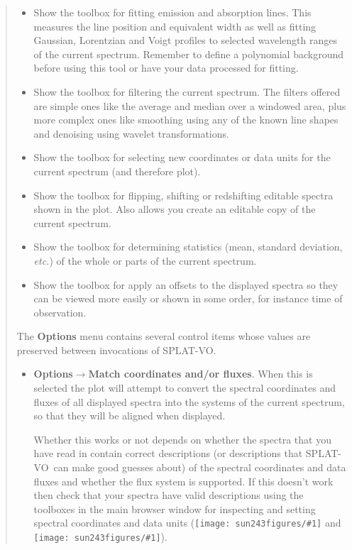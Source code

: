 \documentclass[twoside,11pt]{article}
\newcommand{\htmladdimg}[1]{}
\newcommand{\latexhtml}[2]{#1}
\renewcommand{\_}{\texttt{\symbol{95}}}
\newcommand{\SPLAT}{\textsf{SPLAT-VO}}
\newcommand{\inline}[1]
        {\latexhtml{\texttt{[image: sun243\_figures/\#1]}}
        {\htmladdimg[align=center]{#1.gif}}}
\newcommand{\menuitem}[1]{\textbf{#1}}
\newcommand{\submenuitem}[2]{\latexhtml{\textbf{#1$\rightarrow$#2}}{\textbf{#1->#2}}}
\newcommand{\etc}{\textit{etc.}}
\begin{document}
\begin{quote}
\begin{itemize}
  \item[\inline{fitline}] Show the toolbox for fitting emission and absorption
  lines. This measures the line position and equivalent width as well as
  fitting Gaussian, Lorentzian and Voigt profiles to selected wavelength
  ranges of the current spectrum. Remember to define a polynomial background
  before using this tool or have your data processed for fitting.

  \item[\inline{filter}] Show the toolbox for filtering the current
  spectrum. The filters offered are simple ones like the average and
  median over a windowed area, plus more complex ones like smoothing
  using any of the known line shapes and denoising using wavelet
  transformations.

  \item[\inline{units}] Show the toolbox for selecting new coordinates or
  data units for the current spectrum (and therefore plot).

  \item[\inline{flip}] Show the toolbox for flipping, shifting or redshifting
  editable spectra shown in the plot. Also allows you create an editable copy
  of the current spectrum.

  \item[\inline{sigma}] Show the toolbox for determining statistics (mean,
  standard deviation, \etc) of the whole or parts of the current spectrum.

  \item[\inline{stacker}] Show the toolbox for apply an offsets to the
  displayed spectra so they can be viewed more easily or shown in some order,
  for instance time of observation.

 \end{itemize}

 The \menuitem{Options} menu contains several control items whose values are
 preserved between invocations of \SPLAT.

 \begin{itemize}

  \item \submenuitem{Options}{Match coordinates and/or fluxes}.
  When this is selected the plot will attempt to convert the spectral
  coordinates and fluxes of all displayed spectra into the systems of the
  current spectrum, so that they will be aligned when displayed.

  Whether this works or not depends on whether the spectra that you have read
  in contain correct descriptions (or descriptions that \SPLAT\ can make good
  guesses about) of the spectral coordinates and data fluxes and whether the
  flux system is supported. If this doesn't work then check that your spectra
  have valid descriptions using the toolboxes in the main browser window for
  inspecting and setting spectral coordinates and data units
  (\inline{xunits} and \inline{yunits}).


\end{itemize}
\end{quote}
\end{document}
